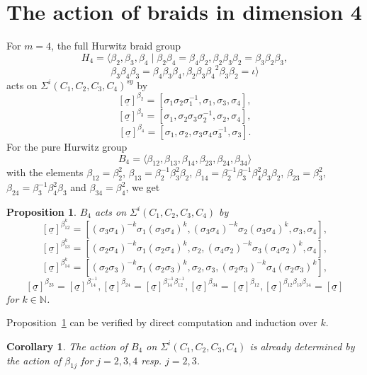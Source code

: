 \documentclass[12pt,a4paper]{article}
\newtheorem{proposition}{Proposition}[section]
\newtheorem{corollary}{Corollary}[section]
\numberwithin{equation}{section}
\numberwithin{table}{section}
\begin{document}
\section{The action of braids in dimension 4}\label{SectionTheActionOfBraidsInDimension4}

For $m=4$, the full Hurwitz braid group
$$H_4 = \langle \beta_2, \beta_3, \beta_4 \mid \beta_2 \beta_4 = \beta_4 \beta_2, \beta_2 \beta_3 \beta_2 = 
\beta_3 \beta_2 \beta_3,$$
$$\beta_3 \beta_4 \beta_3 = \beta_4 \beta_3 \beta_4, \beta_2 \beta_3 {\beta_4}^2 \beta_3 \beta_2 = \iota \rangle$$
acts on $\Sigma^i(C_1,C_2,C_3,C_4)^{sy}$ by
$$[\underline{\sigma}]^{\beta_2} = [\sigma_1 \sigma_2 \sigma_1^{-1}, \sigma_1, \sigma_3, \sigma_4],$$
$$[\underline{\sigma}]^{\beta_3} = [\sigma_1, \sigma_2 \sigma_3 \sigma_2^{-1}, \sigma_2, \sigma_4],$$
$$[\underline{\sigma}]^{\beta_4} = [\sigma_1, \sigma_2, \sigma_3 \sigma_4 \sigma_3^{-1}, \sigma_3].$$
For the pure Hurwitz group 
$$B_4=\langle \beta_{12}, \beta_{13}, \beta_{14}, \beta_{23}, \beta_{24}, \beta_{34} \rangle$$
with the elements
$\beta_{12}=\beta_2^2$,
$\beta_{13}=\beta_2^{-1} \beta_3^2 \beta_2$,
$\beta_{14}=\beta_2^{-1} \beta_3^{-1} \beta_4^2 \beta_3 \beta_2$,
$\beta_{23}=\beta_3^2$,
$\beta_{24}=\beta_3^{-1} \beta_4^2 \beta_3$ and
$\beta_{34}=\beta_4^2$, we get
\begin{proposition}
\label{ActionOfPureHurwitzGroup}
$B_4$ acts on $\Sigma^i(C_1,C_2,C_3,C_4)$ by
$$[\underline{\sigma}]^{\beta^k_{12}} =
[(\sigma_3 \sigma_4)^{-k} \sigma_1 (\sigma_3 \sigma_4)^k, (\sigma_3 \sigma_4)^{-k} \sigma_2 (\sigma_3 \sigma_4)^k,
\sigma_3, \sigma_4],$$
$$[\underline{\sigma}]^{\beta^k_{13}} =
[(\sigma_2 \sigma_4)^{-k} \sigma_1 (\sigma_2 \sigma_4)^k, \sigma_2,
(\sigma_4 \sigma_2)^{-k} \sigma_3 (\sigma_4 \sigma_2)^k, \sigma_4],$$
$$[\underline{\sigma}]^{\beta^k_{14}} =
[(\sigma_2 \sigma_3)^{-k} \sigma_1 (\sigma_2 \sigma_3)^k, \sigma_2, \sigma_3,
(\sigma_2 \sigma_3)^{-k} \sigma_4 (\sigma_2 \sigma_3)^k],$$
$$
[\underline{\sigma}]^{\beta_{23}} = [\underline{\sigma}]^{\beta_{14}^{-1}},
[\underline{\sigma}]^{\beta_{24}} = [\underline{\sigma}]^{\beta_{14}^{-1} \beta_{12}^{-1}},
[\underline{\sigma}]^{\beta_{34}} = [\underline{\sigma}]^{\beta_{12}},
[\underline{\sigma}]^{\beta_{12} \beta_{13} \beta_{14}} = [\underline{\sigma}]
$$
for $k \in \mathbb{N}$.
\end{proposition}
%
\noindent
Proposition~\ref{ActionOfPureHurwitzGroup} can be verified by direct computation and induction over $k$.
%
\begin{corollary}
\label{ActionOfPureHurwitzGroupByBeta1j}
The action of $B_4$ on $\Sigma^i(C_1,C_2,C_3,C_4)$ is already determined by the action
of $\beta_{1j}$ for $j=2,3,4$ resp. $j=2,3$.
\end{corollary}
\end{document}
